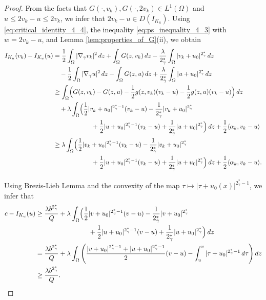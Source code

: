 \documentclass[11pt]{article}
\newcommand{\gradgr}{\nabla_{\gamma}}
\begin{document}
\begin{proof}
From the facts that $G(\cdot, v_k), G(\cdot, 2v_k) \in L^1(\Omega)$ and $u \le 2v_k - u \le 2v_k$, we infer that $2v_k - u \in D(I_{K_u})$. Using \eqref{eq:critical_identity_4_4}, the inequality \eqref{eq:ps_inequality_4_3} with $w = 2v_k - u$, and Lemma \eqref{lem:properties_of_G}(ii), we obtain
\begin{equation*}
\begin{aligned}
I_{K_u}(v_k) - I_{K_u}(u)
&= \frac{1}{2} \int_{\Omega} |\gradgr v_k|^2\, dz
+ \int_{\Omega} G(z, v_k)\, dz
- \frac{\lambda}{2_{\gamma}^*} \int_{\Omega} |v_k + u_{0}|^{2_{\gamma}^*}\, dz \\
&\quad - \frac{1}{2} \int_{\Omega} |\gradgr u|^2\, dz
- \int_{\Omega} G(z, u)\, dz
+ \frac{\lambda}{2_{\gamma}^*} \int_{\Omega} |u + u_{0}|^{2_{\gamma}^*}\, dz \\
&\ge \int_{\Omega} \Bigl(
G(z, v_k) - G(z, u)
- \frac{1}{2} g(z, v_k)(v_k - u)
- \frac{1}{2} g(z, u)(v_k - u)
\Bigr)\, dz \\
&\quad + \lambda \int_{\Omega} \Bigl(
\frac{1}{2} |v_k + u_{0}|^{2_{\gamma}^* - 1} (v_k - u)
- \frac{1}{2_{\gamma}^*} |v_k + u_{0}|^{2_{\gamma}^*} \\
&\qquad\qquad\qquad
+ \frac{1}{2} |u + u_{0}|^{2_{\gamma}^* - 1} (v_k - u)
+ \frac{1}{2_{\gamma}^*} |u + u_{0}|^{2_{\gamma}^*}
\Bigr)\, dz
+ \frac{1}{2} \langle \alpha_k, v_k - u \rangle \\
&\ge \lambda \int_{\Omega} \Bigl(
\frac{1}{2} |v_k + u_{0}|^{2_{\gamma}^* - 1} (v_k - u)
- \frac{1}{2_{\gamma}^*} |v_k + u_{0}|^{2_{\gamma}^*} \\
&\qquad\qquad\qquad
+ \frac{1}{2} |u + u_{0}|^{2_{\gamma}^* - 1} (v_k - u)
+ \frac{1}{2_{\gamma}^*} |u + u_{0}|^{2_{\gamma}^*}
\Bigr)\, dz
+ \frac{1}{2} \langle \alpha_k, v_k - u \rangle .
\end{aligned}
\end{equation*}

Using Brezis-Lieb Lemma and the convexity of the map $\tau \mapsto |\tau + u_{0}(x)|^{2_{\gamma}^* - 1}$, we infer that
\begin{equation*}
\begin{aligned}
c - I_{K_u}(u)
&\ge \frac{\lambda b^{2_{\gamma}^*}}{Q}
+ \lambda \int_{\Omega} \Bigl(
\frac{1}{2} |v + u_{0}|^{2_{\gamma}^* - 1} (v - u)
- \frac{1}{2_{\gamma}^*} |v + u_{0}|^{2_{\gamma}^*} \\
&\qquad\qquad\qquad\qquad
+ \frac{1}{2} |u + u_{0}|^{2_{\gamma}^* - 1} (v - u)
+ \frac{1}{2_{\gamma}^*} |u + u_{0}|^{2_{\gamma}^*}
\Bigr)\, dz \\
&= \frac{\lambda b^{2_{\gamma}^*}}{Q}
+ \lambda \int_{\Omega} \left(
\frac{|v + u_{0}|^{2_{\gamma}^* - 1} + |u + u_{0}|^{2_{\gamma}^* - 1}}{2} (v - u)
- \int_{u}^{v} |\tau + u_{0}|^{2_{\gamma}^* - 1}\, d\tau
\right) dz \\
&\ge \frac{\lambda b^{2_{\gamma}^*}}{Q}.
\end{aligned}
\end{equation*}


\end{proof}
\end{document}
